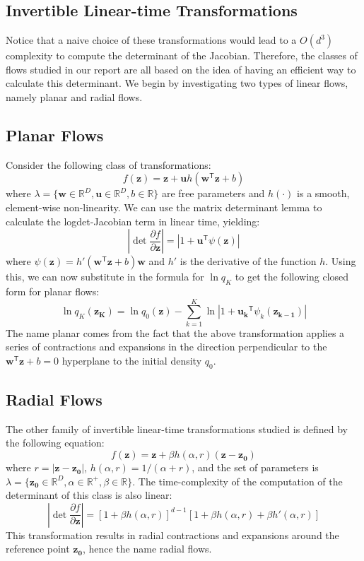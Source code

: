 \subsection{Invertible Linear-time Transformations}
Notice that a naive choice of these transformations would lead to a $O(d^3)$ complexity to compute the determinant of the Jacobian. Therefore, the classes of flows studied in our report are all based on the idea of having an efficient way to calculate this determinant. We begin by investigating two types of linear flows, namely planar and radial flows. 

\subsection{Planar Flows}
Consider the following class of transformations:
\[ f(\mathbf{z}) = \mathbf{z}+\mathbf{u}h(\mathbf{w}^\mathsf{T}\mathbf{z}+b) \]
where $\lambda = \{ \mathbf{w} \in \mathbb{R}^D, \mathbf{u} \in \mathbb{R}^D, b \in \mathbb{R} \}$ are free parameters and $h(\cdot)$ is a smooth, element-wise non-linearity. We can use the matrix determinant lemma to calculate the logdet-Jacobian term in linear time, yielding:
\[ \left| \det \frac{\partial f}{\partial \mathbf{z}} \right| = \left| 1+\mathbf{u}^\mathsf{T}\psi(\mathbf{z})\right| \]
where $\psi(\mathbf{z}) = h'(\mathbf{w}^\mathsf{T}\mathbf{z}+b)\mathbf{w}$ and $h'$ is the derivative of the function $h$. Using this, we can now substitute in the formula for $\ln q_K$ to get the following closed form for planar flows:
\[ \ln q_K (\mathbf{z_K}) = \ln q_0(\mathbf{z}) - \sum_{k=1}^K \ln \left| 1+\mathbf{u_k}^\mathsf{T}\psi_k(\mathbf{z_{k-1}})\right| \]
The name planar comes from the fact that the above transformation applies a series of contractions and expansions in the direction perpendicular to the $\mathbf{w}^\mathsf{T}\mathbf{z}+b = 0$ hyperplane to the initial density $q_0$.

\subsection{Radial Flows}
The other family of invertible linear-time transformations studied is defined by the following equation:
\[f(\mathbf{z}) = \mathbf{z} + \beta h(\alpha,r)(\mathbf{z}-\mathbf{z_0}) \]
where $r=\left| \mathbf{z}-\mathbf{z_0}\right|$, $h(\alpha,r) = 1/(\alpha+r)$, and the set of parameters is $\lambda = \{ \mathbf{z_0}\in \mathbb{R}^D, \alpha \in \mathbb{R} ^{+}, \beta \in \mathbb{R} \}$. The time-complexity of the computation of the determinant of this class is also linear:
\[ \left| \det \frac{\partial f}{\partial \mathbf{z}} \right| = [1+\beta h(\alpha ,r)]^{d-1}[1+\beta h(\alpha ,r)+\beta h'(\alpha ,r)] \] %
This transformation results in radial contractions and expansions around the reference point $\mathbf{z_0}$, hence the name radial flows.

